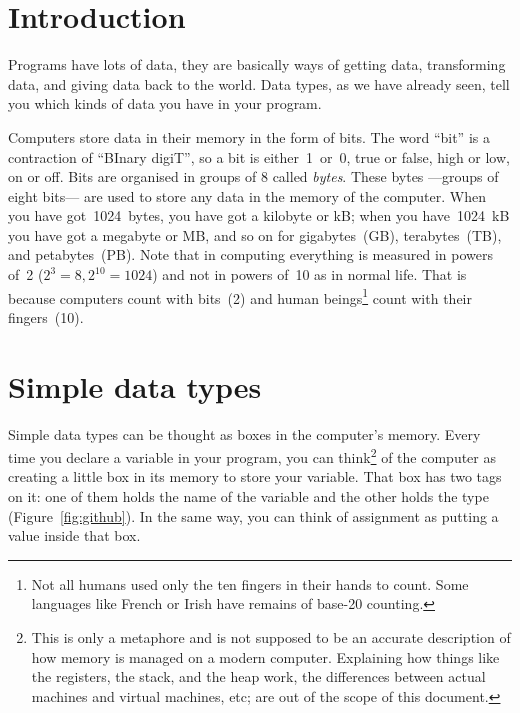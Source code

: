 


%
%
%
%
%
%
%


\section{Introduction}
\label{sec:introduction}

Programs have lots of data, they are basically
ways of getting data, transforming data, and giving data back to the
world. 
%
Data types, as we have already seen, tell you which kinds of data you
have in your program. 

Computers store data in their memory in the form of bits. The word
``bit'' is a contraction of ``BInary digiT'', so a bit is
either~1~or~0, true or false, high or low, on or off. Bits are
organised in groups of 8 called \emph{bytes}. These bytes ---groups of
eight bits--- are used to store any data in the memory of the
computer. When you have got~1024~bytes, you have got a kilobyte or kB;
when you have~1024~kB you have got a megabyte or MB, and so on for
gigabytes~(GB), terabytes~(TB), and petabytes~(PB). Note that in
computing everything is measured in powers of~2 ($2^3 = 8, 2^{10} =
1024$) and not in powers of~10 as in normal life. That is because
computers count with bits~(2) and human beings\footnote{Not all humans
used only the ten fingers in their hands to count. Some languages like
French or Irish have remains of base-20 counting.} count with their
fingers~(10). 

\section{Simple data types}
\label{sec:simple-data-types}

Simple data types can be thought as boxes in the computer's
memory. Every time you declare a variable in your program, you can
think\footnote{This is only a metaphore and is not supposed to be an
  accurate description of how memory is managed on a modern
  computer. Explaining how things like the registers, the stack, and
  the heap work, the differences between actual machines and virtual
  machines, etc; are out of the scope of this document.} of the
computer as creating a little box in its memory to store your
variable. That box has two tags on it: one of them holds the name of
the variable and the other holds the type
(Figure~\ref{fig:github}). In the same way, you can think of
assignment as putting a value inside that box. 

